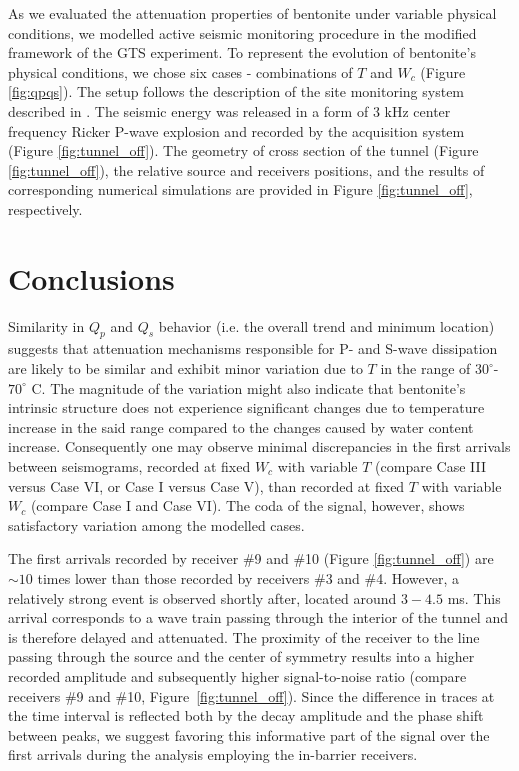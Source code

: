 \documentclass[letterpaper,11pt]{article}
\begin{document}
As we evaluated the attenuation properties of bentonite under variable physical conditions, we modelled active seismic monitoring procedure in the modified framework of the GTS experiment. To represent the evolution of bentonite's physical conditions, we chose six cases - combinations of $T$ and $W_{c}$ (Figure \ref{fig:qpqs}). The setup follows the description of the site monitoring system described in \cite{marelli_appraisal_2010}. The seismic energy was released in a form of 3 kHz center frequency Ricker P-wave explosion and recorded by the acquisition system (Figure \ref{fig:tunnel_off}). The geometry of cross section of the tunnel (Figure \ref{fig:tunnel_off}), the relative source and receivers positions, and the results of corresponding numerical simulations are provided in Figure \ref{fig:tunnel_off}, respectively. 
\section*{Conclusions}
Similarity in $Q_{p}$ and $Q_{s}$ behavior (i.e. the overall trend and minimum location) suggests that attenuation mechanisms responsible for P- and S-wave dissipation are likely to be similar and exhibit minor variation due to $T$ in the range of $30^{\circ}$-$70^{\circ}$ C. The magnitude of the variation might also indicate that bentonite's intrinsic structure does not experience significant changes due to temperature increase in the said range compared to the changes caused by water content increase. Consequently one may observe minimal discrepancies in the first arrivals between seismograms, recorded at fixed $W_{c}$ with variable $T$ (compare Case III versus Case VI, or Case I versus Case V), than recorded at fixed $T$ with variable $W_{c}$ (compare Case I and Case VI). The coda of the signal, however, shows satisfactory variation among the modelled cases.


The first arrivals recorded by receiver \#9 and \#10 (Figure \ref{fig:tunnel_off}) are $\sim 10$ times lower than those recorded by receivers \#3 and \#4. However, a relatively strong event is observed shortly after, located around $3-4.5$ ms. This arrival corresponds to a wave train passing through the interior of the tunnel and is therefore delayed and attenuated. The proximity of the receiver to the line passing through the source and the center of symmetry results into a higher recorded amplitude and subsequently higher signal-to-noise ratio (compare receivers \#9 and \#10, Figure~\ref{fig:tunnel_off}). Since the difference in traces at the time interval is reflected both by the decay amplitude and the phase shift between peaks, we suggest favoring this informative part of the signal over the first arrivals during the analysis employing the in-barrier receivers. 
\end{document}

